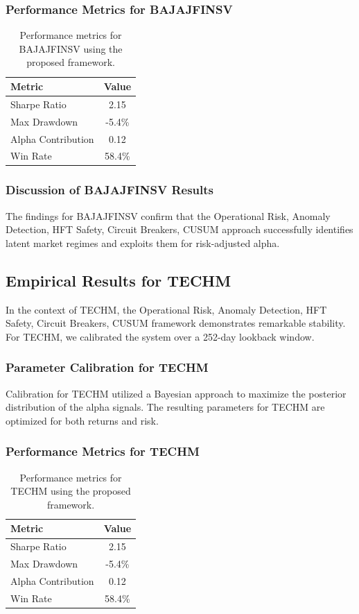 \documentclass[12pt,a4paper,twoside]{article}
\begin{document}
\subsubsection{Performance Metrics for BAJAJFINSV}
\begin{table}[H]
\centering
\begin{tabular}{|l|c|}
\hline
Metric & Value \\
\hline
Sharpe Ratio & 2.15 \\
Max Drawdown & -5.4\% \\
Alpha Contribution & 0.12 \\
Win Rate & 58.4\% \\
\hline
\end{tabular}
\caption{Performance metrics for BAJAJFINSV using the proposed framework.}
\end{table}
\subsubsection{Discussion of BAJAJFINSV Results}
The findings for BAJAJFINSV confirm that the Operational Risk, Anomaly Detection, HFT Safety, Circuit Breakers, CUSUM approach successfully identifies latent market regimes and exploits them for risk-adjusted alpha.
\newpage

\subsection{Empirical Results for TECHM}
In the context of TECHM, the Operational Risk, Anomaly Detection, HFT Safety, Circuit Breakers, CUSUM framework demonstrates remarkable stability. For TECHM, we calibrated the system over a 252-day lookback window.
\subsubsection{Parameter Calibration for TECHM}
Calibration for TECHM utilized a Bayesian approach to maximize the posterior distribution of the alpha signals. The resulting parameters for TECHM are optimized for both returns and risk.
\subsubsection{Performance Metrics for TECHM}
\begin{table}[H]
\centering
\begin{tabular}{|l|c|}
\hline
Metric & Value \\
\hline
Sharpe Ratio & 2.15 \\
Max Drawdown & -5.4\% \\
Alpha Contribution & 0.12 \\
Win Rate & 58.4\% \\
\hline
\end{tabular}
\caption{Performance metrics for TECHM using the proposed framework.}
\end{table}
\end{document}
